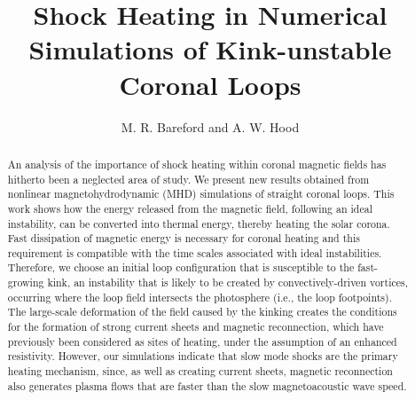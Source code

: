 \documentclass{./packages/rs/rsproca}
\begin{document}
\title{Shock Heating in Numerical Simulations of Kink-unstable Coronal Loops}

\author{%
M. R. Bareford and A. W. Hood}

\address{School of Mathematics and Statistics,\\University of St Andrews, North Haugh, St Andrews, Fife KY16 9SS, UK}

\subject{Solar system (169), Computer modelling and simulations, Plasma physics}



\begin{abstract}
An analysis of the importance of shock heating within coronal magnetic fields has hitherto been a neglected area of study. We present new results obtained from nonlinear magnetohydrodynamic (MHD) simulations of straight coronal loops. This work shows how the energy released from the magnetic field, following an ideal instability, can be converted into thermal energy, thereby heating the solar corona. Fast dissipation of magnetic energy is necessary for coronal heating and this requirement is compatible with the time scales associated with ideal instabilities. Therefore, we choose an initial loop configuration that is susceptible to the fast-growing kink, an instability that is likely to be created by convectively-driven vortices, occurring where the loop field intersects the photosphere (i.e., the loop footpoints). The large-scale deformation of the field caused by the kinking creates the conditions for the formation of strong current sheets and magnetic reconnection, which have previously been considered as sites of heating, under the assumption of an enhanced resistivity. However, our simulations indicate that slow mode shocks are the primary heating mechanism, since, as well as creating current sheets, magnetic reconnection also generates plasma flows that are faster than the slow magnetoacoustic wave speed.
\end{abstract}

\begin{fmtext}
\end{fmtext}
\end{document}
